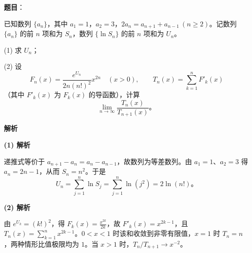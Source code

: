 \begin{answer}

\textbf{题目}：

已知数列 $\{a_n\}$，其中 $a_1=1$，$a_2=3$，$2a_n=a_{n+1}+a_{n-1}\ (n\geqslant2)$。记数列 $\{a_n\}$ 的前 $n$ 项和为 $S_n$，数列 $\{\ln S_n\}$ 的前 $n$ 项和为 $U_n$。

(1) 求 $U_n$；

(2) 设
\nopagebreak[4]
\[
F_n(x)=\frac{e^{U_n}}{2n(n!)^2}x^{2n}\quad(x>0),\qquad
T_n(x)=\sum_{k=1}^{n}F'_k(x)
\]
（其中 $F'_k(x)$ 为 $F_k(x)$ 的导函数），计算
\nopagebreak[4]
\[
\lim_{n\to\infty}\frac{T_n(x)}{T_{n+1}(x)}\mbox{。}
\]

\textbf{解析}

\textbf{(1) 解析}

递推式等价于 $a_{n+1}-a_n=a_n-a_{n-1}$，故数列为等差数列。由 $a_1=1\text{、}a_2=3$ 得 $a_n=2n-1$，从而 $S_n=n^2$。于是
\nopagebreak[4]
\[
U_n=\sum_{j=1}^n\ln S_j=\sum_{j=1}^n\ln(j^2)=2\ln(n!)\mbox{。}
\]

\textbf{(2) 解析}

由 $e^{U_k}=(k!)^2$，得 $F_k(x)=\frac{x^{2k}}{2k}$，故 $F'_k(x)=x^{2k-1}$，且 $T_n(x)=\sum_{k=1}^n x^{2k-1}$。$0<x<1$ 时该和收敛到非零有限值，$x=1$ 时 $T_n=n$，两种情形比值极限均为 $1$。当 $x>1$ 时，$T_n/T_{n+1}\to x^{-2}$。



\end{answer}
